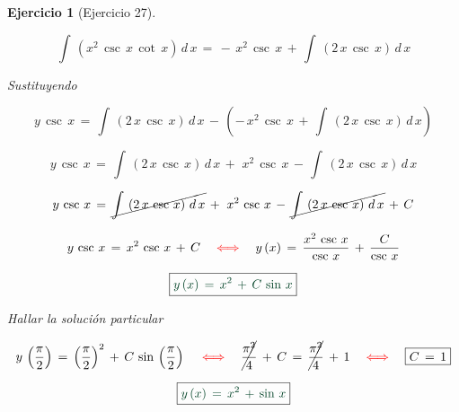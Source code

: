 \documentclass[a4paper,11pt,openany]{book}
\newtheorem{ejer}{Ejercicio}[section]
\begin{document}
\begin{ejer}[Ejercicio 27]
\begin{tcolorbox}[colback=red!5!white,colframe=red!75!black,fonttitle=\bfseries,title=$I_{2}$]
$$\boxed{\int\,\left(x^{2}\,\csc\,x\,\cot\,x \right)\,d\,x\,=\,-\,x^{2}\,\csc\,x\,+\,\int\,\left(2\,x\,\csc\,x \right)\,d\,x}$$ 

\end{tcolorbox} 

Sustituyendo 

$$y\,\csc\,x\,=\,\int\,\left( 2\,x\,\csc\,x \right)\,d\,x\,-\,\left(-\,x^{2}\,\csc\,x\,+\,\int\,\left(2\,x\,\csc\,x \right)\,d\,x \right)$$ 

$$y\,\csc\,x\,=\,\int\,\left( 2\,x\,\csc\,x \right)\,d\,x\,+\,\,x^{2}\,\csc\,x\,-\,\int\,\left(2\,x\,\csc\,x \right)\,d\,x $$ 

$$y\,\csc\,x\,=\,\cancel{\int\,\left( 2\,x\,\csc\,x \right)\,d\,x}\,+\,\,x^{2}\,\csc\,x\,-\,\cancel{\int\,\left(2\,x\,\csc\,x \right)\,d\,x}\,+\,C $$ 

$$y\,\csc\,x\,=\,x^{2}\,\csc\,x\,+\,C\quad \textcolor{red}{\iff} \quad y\,(x)\,=\,\dfrac{x^{2}\,\csc\,x}{\csc\,x}\,+\,\dfrac{C}{\csc\,x}$$ 

$$\boxed{\textcolor{britishracinggreen}{y\,(x)\,=\,x^{2}\,+\,C\,\sin\,x}}$$ 

 Hallar la solución particular 

$$y\,\left(\dfrac{\pi}{2} \right)\,=\,\left(\dfrac{\pi}{2} \right)^{2}\,+\,C\,\sin\,\left(\dfrac{\pi}{2} \right) \quad \textcolor{red}{\iff} \quad \cancel{\dfrac{\pi^{2}}{4}}\,+\,C\,=\,\cancel{\dfrac{\pi^{2}}{4}}\,+\,1 \quad \textcolor{red}{\iff} \quad \boxed{C\,=\,1}$$ 

$$\boxed{\textcolor{britishracinggreen}{y\,(x)\,=\,x^{2}\,+\,\sin\,x}}$$ 

\end{ejer} 
\end{document}
